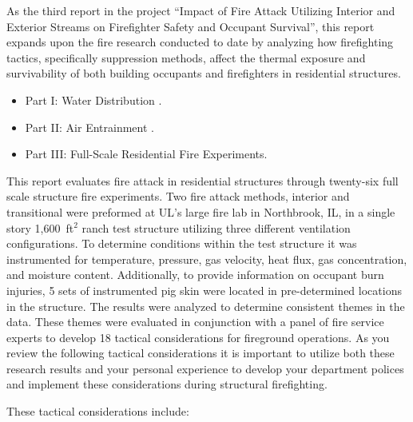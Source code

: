 \documentclass[12pt,oneside]{book}
\begin{document}
As the third report in the project ``Impact of Fire Attack Utilizing Interior and Exterior Streams on Firefighter Safety and Occupant Survival'', this report expands upon the fire research conducted to date by analyzing how firefighting tactics, specifically suppression methods, affect the thermal exposure and survivability of both building occupants and firefighters in residential structures. 

\begin{itemize}
	\item Part I: Water Distribution \cite{Weinchenk_watermapping}.
	\item Part II: Air Entrainment \cite{Weinchenk_airentrainment}.
	\item Part III: Full-Scale Residential Fire Experiments.
\end{itemize}

This report evaluates fire attack in residential structures through twenty-six full scale structure fire experiments. Two fire attack methods, interior and transitional were preformed at UL's large fire lab in Northbrook, IL, in a single story 1,600~ft$^2$ ranch test structure utilizing three different ventilation configurations. To determine conditions within the test structure it was instrumented for temperature, pressure, gas velocity, heat flux, gas concentration, and moisture content. Additionally, to provide information on occupant burn injuries, 5 sets of instrumented pig skin were located in pre-determined locations in the structure. The results were analyzed to determine consistent themes in the data. These themes were evaluated in conjunction with a panel of fire service experts to develop 18 tactical considerations for fireground operations. As you review the following tactical considerations it is important to utilize both these research results and your personal experience to develop your department polices and implement these considerations during structural firefighting. 

These tactical considerations include:
\end{document}
